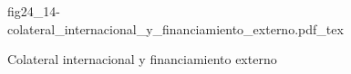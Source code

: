 \begin{figure}[h]
\centering
\def\svgwidth{0.5\textwidth}
{fig24_14-colateral_internacional_y_financiamiento_externo.pdf_tex}
\caption{Colateral internacional y financiamiento externo}
\label{fig24_14-colateral_int_fin_ext}
\end{figure}